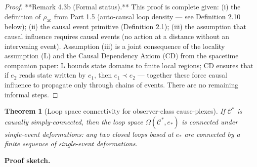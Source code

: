 \documentclass[11pt]{article}
\newtheorem{theorem}{Theorem}[section]
\theoremstyle{definition}
\theoremstyle{remark}
\begin{document}
\begin{proof}
**Remark 4.3b (Formal status).** This proof is complete given: (i) the definition of $\rho_{\mathrm{ac}}$ from Part 1.5 (auto-causal loop density — see Definition 2.10 below); (ii) the causal event primitive (Definition 2.1); (iii) the assumption that causal influence requires causal events (no action at a distance without an intervening event). Assumption (iii) is a joint consequence of the locality assumption (L) and the Causal Dependency Axiom (CD) from the spacetime companion paper: L bounds state domains to finite local regions; CD ensures that if $e_2$ reads state written by $e_1$, then $e_1 \prec e_2$ — together these force causal influence to propagate only through chains of events. There are no remaining informal steps.

\end{proof}

\begin{theorem}[Loop space connectivity for observer-class cause-plexes]
\label{theorem:4-4}
If $\mathcal{C}^{*}$ is causally simply-connected, then the loop space $\Omega(\mathcal{C}^{*}, e_{*})$ is connected under single-event deformations: any two closed loops based at $e_{*}$ are connected by a finite sequence of single-event deformations.
\end{theorem}

\textbf{Proof sketch.}
\end{document}

